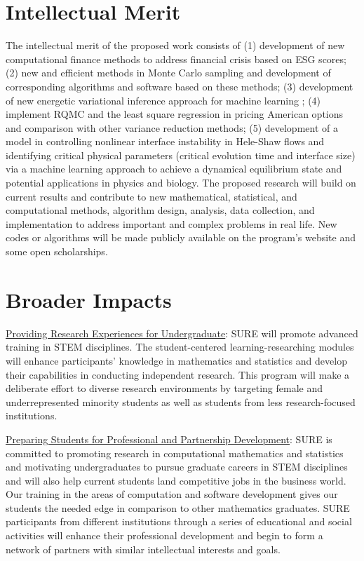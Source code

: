 \documentclass[11pt]{NSFamsart}
\newcommand{\Upara}[1]{\noindent\underline{\upshape #1}:}
\begin{document}
\section{Intellectual Merit}
The intellectual merit of the proposed work consists of (1) development of new computational finance methods to address financial crisis based on ESG scores; (2)
new and efficient methods in Monte Carlo sampling and development of corresponding algorithms and software based on these methods; (3) development of new energetic variational inference approach for machine learning ; (4) 
implement RQMC and the least square regression in pricing American options and comparison with other variance reduction methods; (5) development of a model in controlling nonlinear interface instability in Hele-Shaw flows and identifying critical physical parameters (critical evolution time and interface size) via a machine learning approach to achieve a dynamical equilibrium state and potential applications in physics and biology.
The proposed research will build on current results and contribute to new mathematical, statistical,
and computational methods, algorithm design, analysis, data collection, and implementation to address
important and complex problems in real life. New codes or algorithms will be made publicly
available on the program’s website and some open scholarships.

\section{Broader Impacts}
\begin{sloppypar}\Upara{Providing Research Experiences for Undergraduate} 
SURE will promote advanced training in STEM
disciplines. The student-centered learning-researching modules will enhance participants’ knowledge in
mathematics and statistics and develop their capabilities in conducting independent research. This program will make a deliberate effort to diverse research environments by targeting female and underrepresented minority students as well as students from less research-focused institutions. \end{sloppypar}

\Upara{Preparing Students for Professional and Partnership Development} 
SURE is committed to promoting research in computational mathematics and statistics and motivating undergraduates to pursue graduate careers in STEM disciplines and will also help current students land competitive jobs in the business world. Our training in the areas of computation and software development gives our students the needed edge in comparison to other mathematics graduates. SURE participants from different institutions through a series of educational and social activities will enhance their professional development and begin to form a network of partners with similar intellectual interests and goals. 
\end{document}
